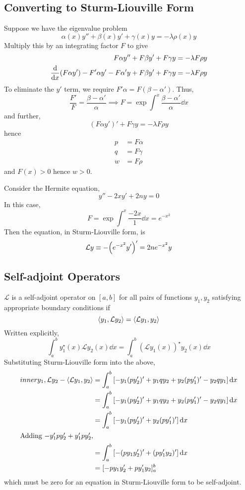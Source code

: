 \subsection{Converting to Sturm-Liouville Form}
Suppose we have the eigenvalue problem
\[
	\alpha(x) y'' + \beta(x) y' + \gamma(x) y = -\lambda \rho(x) y
\]
Multiply this by an integrating factor \( F \) to give
\begin{align*}
	F \alpha y'' + F \beta y' + F \gamma y                                          & = -\lambda F \rho y \\
	\dv{x} \qty(F \alpha y') - F' \alpha y' - F \alpha' y + F \beta y' + F \gamma y & = -\lambda F \rho y
\end{align*}
To eliminate the \( y' \) term, we require \( F'\alpha = F(\beta - \alpha') \).
Thus,
\[
	\frac{F'}{F} = \frac{\beta - \alpha'}{\alpha} \implies F = \exp \int^x \frac{\beta - \alpha'}{\alpha} \dd{x}
\]
and further,
\[
	(F\alpha y')' + F \gamma y = - \lambda F \rho y
\]
hence
\begin{align*}
	p & = F \alpha \\
	q & = F \gamma \\
	w & = F \rho
\end{align*}
and \( F(x) > 0 \) hence \( w > 0 \).
\begin{example}
	Consider the Hermite equation,
	\[
		y'' - 2xy' + 2ny = 0
	\]
	In this case,
	\[
		F = \exp \int^x \frac{-2x}{1} \dd{x} = e^{-x^2}
	\]
	Then the equation, in Sturm-Liouville form, is
	\[
		\mathcal L y \equiv -\qty(e^{-x^2} y')' = 2n e^{-x^2} y
	\]
\end{example}

\subsection{Self-adjoint Operators}
\( \mathcal L \) is a self-adjoint operator on \( [a,b] \) for all pairs of functions \( y_1,y_2 \) satisfying appropriate boundary conditions if
\[
	\left\langle{y_1, \mathcal L y_2}\right\rangle = \left\langle{\mathcal L y_1, y_2}\right\rangle
\]
Written explicitly,
\[
	\int_a^b y_1^\star(x) \mathcal L y_2(x) \dd{x} = \int_a^b (\mathcal L y_1(x))^\star y_2(x) \dd{x}
\]
Substituting Sturm-Liouville form into the above,
\begin{align*}
	inner{y_1, \mathcal L y_2} - \left\langle{\mathcal L y_1, y_2}\right\rangle & = \int_a^b \qty[-y_1 (py_2')' + y_1 q y_2 + y_2 (p y_1')' - y_2 q y_1] \dd{x} \\
	                                                         & = \int_a^b \qty[-y_1 (py_2')' + y_1 q y_2 + y_2 (p y_1')' - y_2 q y_1] \dd{x} \\
	                                                         & = \int_a^b \qty[-y_1 (py_2')' + y_2 (p y_1')'] \dd{x}                         \\
	\intertext{Adding \( -y_1' p y_2' + y_1' p y_2' \),}
	                                                         & = \int_a^b \qty[-(py_1y_2')' + (py_1'y_2)'] \dd{x}                            \\
	                                                         & = [-py_1y_2' + py_1'y_2]_a^b
\end{align*}
which must be zero for an equation in Sturm-Liouville form to be self-adjoint.

